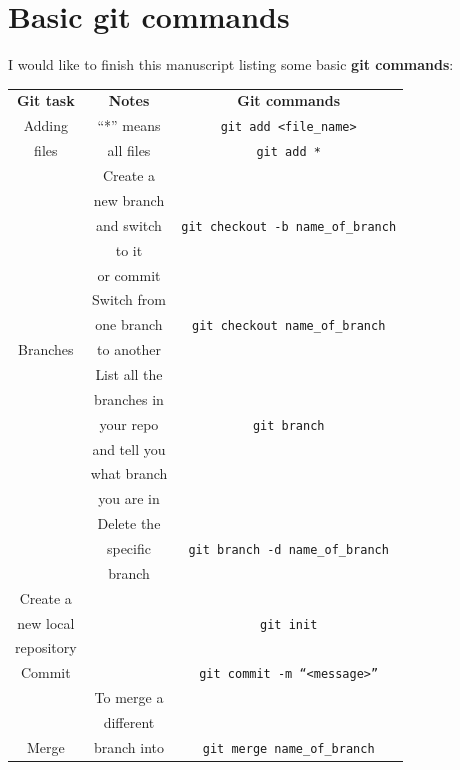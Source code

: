 \documentclass[12pt,a4paper,titlepage,brazil]{article}
\begin{document}
{\section{Basic git commands}

I would like to finish this manuscript listing some basic {\bf git commands}:

\begin{table}[h!]
 \begin{center}
  \begin{tabular}{c|c|c}
   \cline{1-3}
   \textbf{Git task} & \textbf{Notes} & \textbf{Git commands} \\
   \cline{1-3}
   Adding & ``*'' means & \texttt{git add <file\_name>}\\
   files & all files & \texttt{git add *}\\
   \cline{1-3} 
   & Create a & \\
   & new branch & \\
   & and switch & \texttt{git checkout -b name\_of\_branch}\\
   & to it & \\
   & or commit & \\
   \cline{2-3}
   & Switch from & \\
   & one branch & \texttt{git checkout name\_of\_branch}\\
   Branches & to another & \\    
   \cline{2-3}
   & List all the & \\
   & branches in & \\
   & your repo & \texttt{git branch} \\    
   & and tell you & \\
   & what branch & \\
   & you are in & \\
   \cline{2-3} 
   & Delete the & \\
   & specific & \texttt{git branch -d name\_of\_branch}\\
   & branch & \\    
   \cline{1-3}
   Create a & & \\
   new local & & \texttt{git init}\\
   repository & & \\
   \cline{1-3} 
   Commit & & \texttt{git commit -m ``<message>''}\\
   \cline{1-3} 
   & To merge a & \\
   & different & \\
   Merge & branch into & \texttt{git merge name\_of\_branch}\\

\end{tabular}
\end{center}
\end{table}}
\end{document}
